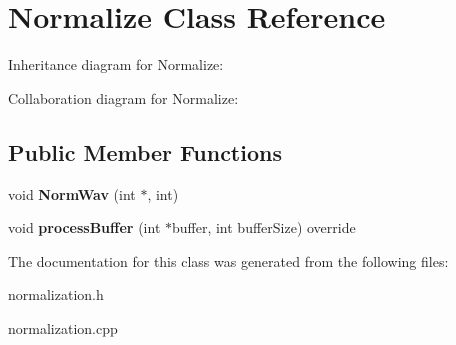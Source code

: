 \hypertarget{classNormalize}{}\section{Normalize Class Reference}
\label{classNormalize}


Inheritance diagram for Normalize\+:


Collaboration diagram for Normalize\+:
\subsection*{Public Member Functions}
\begin{DoxyCompactItemize}
\item 
\mbox{\label{classNormalize_a4519714813b90d937a3881c70f6eab4a}} 
void {\bfseries Norm\+Wav} (int $\ast$, int)
\item 
\mbox{\label{classNormalize_aff0e708e69431e5c5582bc612889e8df}} 
void {\bfseries process\+Buffer} (int $\ast$buffer, int buffer\+Size) override
\end{DoxyCompactItemize}


The documentation for this class was generated from the following files\+:\begin{DoxyCompactItemize}
\item 
normalization.\+h\item 
normalization.\+cpp\end{DoxyCompactItemize}
